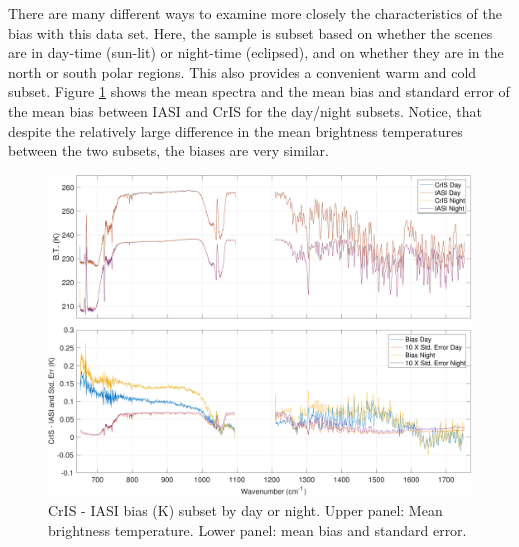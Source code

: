\documentclass[twocolumn,10pt]{article}
\begin{document}
There are many different ways to examine more closely the characteristics of the bias with this data set. Here, the sample is subset based on whether the scenes are in day-time (sun-lit) or night-time (eclipsed), and on whether they are in the north or south polar regions. This also provides a convenient warm and cold subset. Figure \ref{fig:X5} shows the mean spectra and the mean bias and standard error of the mean bias between IASI and CrIS for the day/night subsets. Notice, that despite the
relatively large difference in the mean brightness temperatures between the two subsets, the biases are very similar.




\begin{figure}[htb]
    \centering
  \includegraphics[width=\linewidth]{./figs/ic_jpl_sno_day_night_bias_stderr_lw_mw.pdf}
    \caption{CrIS - IASI bias (K) subset by day or night. Upper panel: Mean brightness temperature. Lower panel: mean bias and standard error.}
    \label{fig:X5}
\end{figure}
\end{document}
